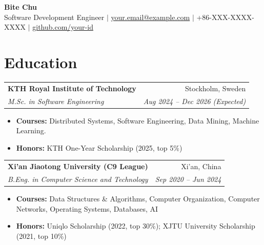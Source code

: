 \documentclass[11pt]{article}
\makeatletter
\newcommand{\entry}[4]{%
  \begin{tabularx}{\linewidth}{@{}X r@{}}
    \textbf{#1} & #2 \\
    \textit{#3} & \textit{#4} \\
  \end{tabularx}\vspace{-2pt}%
}
\makeatother
\begin{document}
\begin{center}
  {\LARGE\bfseries Bite Chu} \\[3pt]
  \small Software Development Engineer \quad$|$\quad
  \href{mailto:your.email@example.com}{your.email@example.com} \quad$|$\quad
  +86-XXX-XXXX-XXXX \quad$|$\quad
  \href{https://github.com/your-id}{github.com/your-id}
\end{center}
\vspace{-6pt}

\section{Education}
\entry{KTH Royal Institute of Technology}{Stockholm, Sweden}
      {M.Sc. in Software Engineering}{Aug 2024 -- Dec 2026 (Expected)}
\begin{itemize}
  \item \textbf{Courses:} Distributed Systems, Software Engineering, Data Mining, Machine Learning.
  \item \textbf{Honors:} KTH One-Year Scholarship (2025, top 5\%)
\end{itemize}
\vspace{2pt}
\entry{Xi'an Jiaotong University (C9 League)}{Xi'an, China}
      {B.Eng. in Computer Science and Technology}{Sep 2020 -- Jun 2024}
\begin{itemize}
  \item \textbf{Courses:} Data Structures \& Algorithms, Computer Organization, Computer Networks, Operating Systems, Databases, AI
  \item \textbf{Honors:} Uniqlo Scholarship (2022, top 30\%); XJTU University Scholarship (2021, top 10\%)
\end{itemize}

\end{document}
